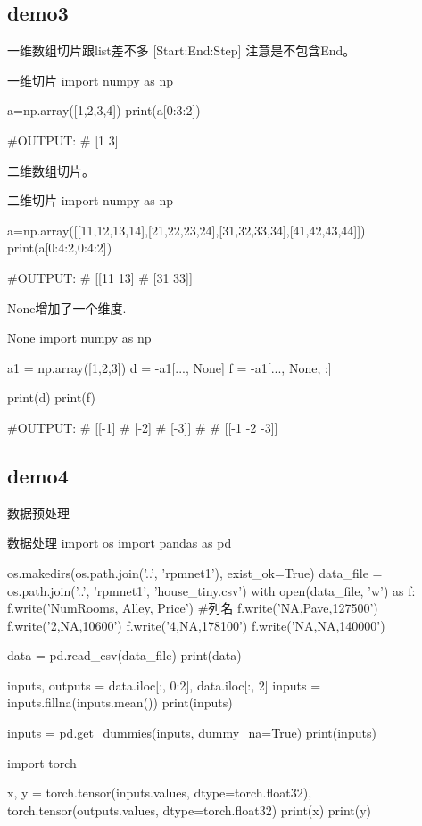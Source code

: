 \documentclass[11pt]{article}
\begin{document}
\subsection{demo3}
一维数组切片跟list差不多 [Start:End:Step] 注意是不包含End。
\begin{Python}{一维切片}
import  numpy as np

a=np.array([1,2,3,4])
print(a[0:3:2])

#OUTPUT:
#		[1 3]
\end{Python}
二维数组切片。
\begin{Python}{二维切片}
import  numpy as np

a=np.array([[11,12,13,14],[21,22,23,24],[31,32,33,34],[41,42,43,44]])
print(a[0:4:2,0:4:2])

#OUTPUT:
#		[[11 13]
#		 [31 33]]
\end{Python}
None增加了一个维度.
\begin{Python}{None}
import numpy as np

a1 = np.array([1,2,3])
d = -a1[..., None]
f = -a1[..., None, :]

print(d)
print(f)

#OUTPUT:
#		[[-1]
#		 [-2]
#		 [-3]]
#
#		[[-1 -2 -3]]
\end{Python}
\subsection{demo4}
数据预处理
\begin{Python}{数据处理}
import os
import pandas as pd

os.makedirs(os.path.join('..', 'rpmnet1'), exist_ok=True)
data_file = os.path.join('..', 'rpmnet1', 'house_tiny.csv')
with open(data_file, 'w') as f:
f.write('NumRooms, Alley, Price\n')     #列名
f.write('NA,Pave,127500\n')
f.write('2,NA,10600\n')
f.write('4,NA,178100\n')
f.write('NA,NA,140000\n')

data = pd.read_csv(data_file)
print(data)

inputs, outputs = data.iloc[:, 0:2], data.iloc[:, 2]
inputs = inputs.fillna(inputs.mean())
print(inputs)

inputs = pd.get_dummies(inputs, dummy_na=True)
print(inputs)

import torch

x, y = torch.tensor(inputs.values, dtype=torch.float32), torch.tensor(outputs.values, dtype=torch.float32)
print(x)
print(y)
\end{Python}
\end{document}
